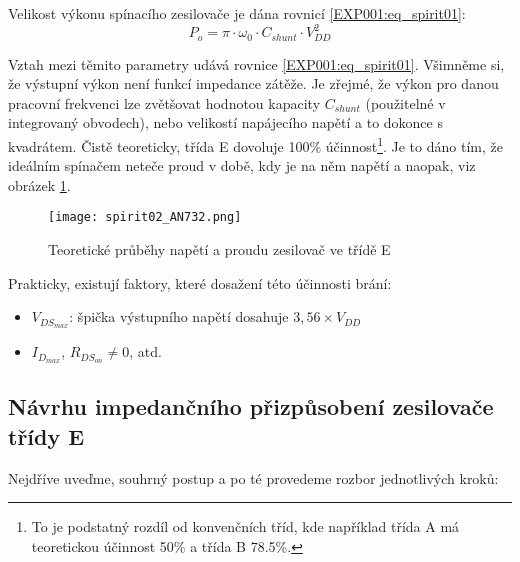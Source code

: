       Velikost výkonu spínacího zesilovače je dána rovnicí \ref{EXP001:eq_spirit01}:
      \begin{equation}\label{EXP001:eq_spirit01}
        P_o = \pi\cdot\omega_0\cdot C_{shunt}\cdot V_{DD}^2
      \end{equation}

      Vztah mezi těmito parametry udává rovnice \ref{EXP001:eq_spirit01}. Všimněme si, že výstupní
      výkon není funkcí impedance zátěže. Je zřejmé, že výkon pro danou pracovní frekvenci lze
      zvětšovat hodnotou kapacity \(C_{shunt}\) (použitelné v integrovaný obvodech), nebo velikostí
      napájecího napětí a to dokonce s kvadrátem.  Čistě teoreticky, třída E dovoluje 100\%
      účinnost\footnote{To je podstatný rozdíl od konvenčních  tříd, kde například třída A má
      teoretickou účinnost 50\% a třída B 78.5\%.}. Je to dáno tím, že ideálním spínačem neteče
      proud v době, kdy je na něm napětí a naopak, viz obrázek  \ref{EXP001:fig_spirit02}.
      
      \begin{figure}[ht!]  %
        \centering
        \texttt{[image: spirit02\_AN732.png]}
        \caption{Teoretické průběhy napětí a proudu zesilovač ve třídě E 
                 \cite[s.~10]{AN648SiliconLabs}}
        \label{EXP001:fig_spirit02}
      \end{figure} 
      
      Prakticky, existují faktory, které dosažení této účinnosti brání: 
      \begin{itemize}\addtolength{\itemsep}{-0.5\baselineskip}
        \item \(V_{DS_{max}}\): špička výstupního napětí dosahuje \(3,56 \times V_{DD}\) 
        \item \(I_{D_{max}}\), \(R_{DS_{on}} \neq 0\), atd.
      \end{itemize}

    \subsection{Návrhu impedančního přizpůsobení zesilovače třídy E} %
      Nejdříve uveďme, souhrný postup a po té provedeme rozbor jednotlivých kroků:
      
